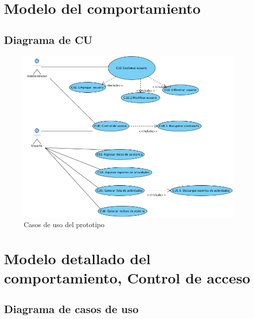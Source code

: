 \documentclass[10pt]{book}
\begin{document}


\chapter{Modelo del comportamiento}

\section{Diagrama de CU}

\begin{figure}[htbp!]
	\begin{center}
		\includegraphics[angle=90,height=\textheight]{images/casosDeUso}
		\caption{Casos de uso del prototipo}
		\label{fig:default}
	\end{center}
\end{figure}

\chapter{Modelo detallado del comportamiento, Control de acceso} 

\section{Diagrama de casos de uso}
\end{document}
